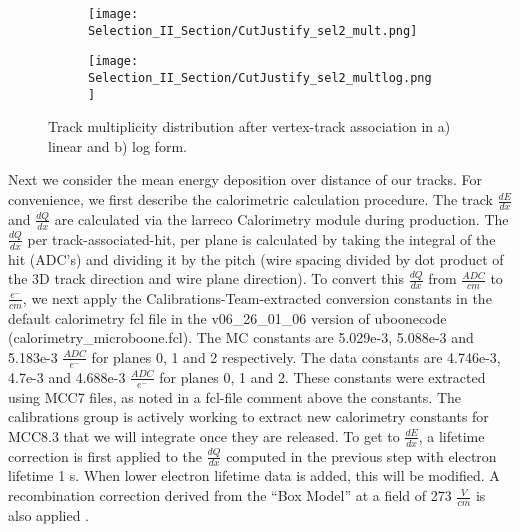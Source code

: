 \begin{figure}[h!]
\centering
  \begin{subfigure}[t]{0.4\textwidth}
    \centering
\texttt{[image: Selection\_II\_Section/CutJustify\_sel2\_mult.png]}
    \caption{ }
  \end{subfigure} 
  \hspace{10 mm}
  \begin{subfigure}[t]{0.4\textwidth}
    \centering
\texttt{[image: Selection\_II\_Section/CutJustify\_sel2\_multlog.png]}
    \caption{ }
  \end{subfigure} 
\caption{ Track multiplicity distribution after vertex-track association in a) linear and b) log form. }
\label{fig:cutjust_sel2_mult}
\end{figure}

\par  Next we consider the mean energy deposition over distance of our tracks.  For convenience, we first describe the calorimetric calculation procedure. The track $\frac{dE}{dx}$ and $\frac{dQ}{dx}$ are calculated via the larreco Calorimetry module during production.  The $\frac{dQ}{dx}$ per track-associated-hit, per plane is calculated by taking the integral of the hit (ADC's) and dividing it by the pitch (wire spacing divided by dot product of the 3D track direction and wire plane direction). To convert this $\frac{dQ}{dx}$ from $\frac{ADC}{cm}$ to $\frac{e^-}{cm}$, we next apply the Calibrations-Team-extracted conversion constants in the default calorimetry fcl file in the v06\_26\_01\_06 version of uboonecode (calorimetry\_microboone.fcl). The MC constants are 5.029e-3, 5.088e-3 and 5.183e-3 $\frac{ADC}{e^-}$ for planes 0, 1 and 2 respectively.  The data constants are 4.746e-3, 4.7e-3 and 4.688e-3 $\frac{ADC}{e^-}$ for planes 0, 1 and 2.  These constants were extracted using MCC7 files, as noted in a fcl-file comment above the constants.  The calibrations group is actively working to extract new calorimetry constants for MCC8.3 that we will integrate once they are released. 
To get to $\frac{dE}{dx}$, a lifetime correction is first applied to the $\frac{dQ}{dx}$ computed in the previous step with electron lifetime 1 s. When lower electron lifetime data is added, this will be modified.  A recombination correction derived from the ``Box Model'' at a field of 273 $\frac{V}{cm}$ is also applied \cite{bib:argoneut_recomb}. %


